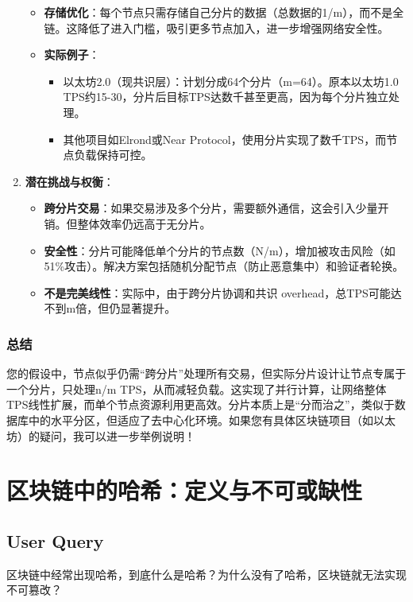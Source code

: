 \documentclass[a4paper,12pt]{ctexart}
\begin{document}
\begin{enumerate}
\begin{itemize}
        \item \textbf{存储优化}：每个节点只需存储自己分片的数据（总数据的1/m），而不是全链。这降低了进入门槛，吸引更多节点加入，进一步增强网络安全性。
        \item \textbf{实际例子}：
        \begin{itemize}
            \item 以太坊2.0（现共识层）：计划分成64个分片（m=64）。原本以太坊1.0 TPS约15-30，分片后目标TPS达数千甚至更高，因为每个分片独立处理。
            \item 其他项目如Elrond或Near Protocol，使用分片实现了数千TPS，而节点负载保持可控。
        \end{itemize}
    \end{itemize}
    \item \textbf{潜在挑战与权衡}：
    \begin{itemize}
        \item \textbf{跨分片交易}：如果交易涉及多个分片，需要额外通信，这会引入少量开销。但整体效率仍远高于无分片。
        \item \textbf{安全性}：分片可能降低单个分片的节点数（N/m），增加被攻击风险（如51\%攻击）。解决方案包括随机分配节点（防止恶意集中）和验证者轮换。
        \item \textbf{不是完美线性}：实际中，由于跨分片协调和共识 overhead，总TPS可能达不到m倍，但仍显著提升。
    \end{itemize}
\end{enumerate}

\subsubsection*{总结}
您的假设中，节点似乎仍需“跨分片”处理所有交易，但实际分片设计让节点专属于一个分片，只处理n/m TPS，从而减轻负载。这实现了并行计算，让网络整体TPS线性扩展，而单个节点资源利用更高效。分片本质上是“分而治之”，类似于数据库中的水平分区，但适应了去中心化环境。如果您有具体区块链项目（如以太坊）的疑问，我可以进一步举例说明！

\newpage
\section*{区块链中的哈希：定义与不可或缺性}
\subsection*{User Query}
区块链中经常出现哈希，到底什么是哈希？为什么没有了哈希，区块链就无法实现不可篡改？
\end{document}
